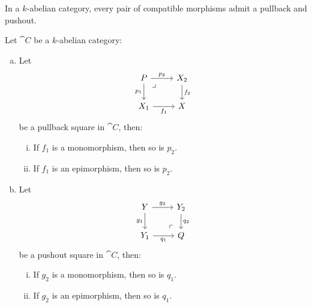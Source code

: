 \begin{corollary}
\label{cor:abelian-cat-has-all-pullbacks}
In a \(k\)-abelian category, every pair of compatible morphisms admit a pullback
and pushout.
\end{corollary}

\begin{lemma}
\label{lem:pullback-pushout-mono-epi}
Let \(\cat C\) be a \(k\)-abelian category:
\begin{enumerate}[(a)]\setlength\itemsep{0em}
\item Let
  \[
  \begin{tikzcd}
  P \ar[r, "p_2"] \ar[d, "p_1"']
  \ar[rd, phantom, "\lrcorner", very near start]
  &X_2 \ar[d, "f_2"] \\
  X_1 \ar[r, "f_1"'] & X
  \end{tikzcd}
  \]
  be a pullback square in \(\cat C\), then:
  \begin{enumerate}[(i)]\setlength\itemsep{0em}
  \item If \(f_1\) is a monomorphism, then so is \(p_2\).
  \item If \(f_1\) is an epimorphism, then so is \(p_2\).
  \end{enumerate}

\item Let
  \[
  \begin{tikzcd}
  Y \ar[r, "g_2"] \ar[d, "g_1"']
  &Y_2 \ar[d, "q_2"] \\
  Y_1 \ar[r, "q_1"']
  & Q \ar[lu, "\ulcorner", phantom, very near start]
  \end{tikzcd}
  \]
  be a pushout square in \(\cat C\), then:
  \begin{enumerate}[(i)]\setlength\itemsep{0em}
  \item If \(g_2\) is a monomorphism, then so is \(q_1\).
  \item If \(g_2\) is an epimorphism, then so is \(q_1\).
  \end{enumerate}
\end{enumerate}
\end{lemma}

